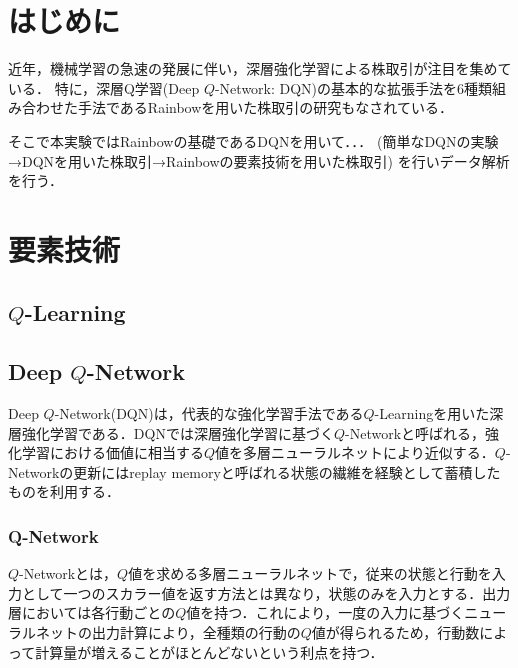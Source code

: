 \documentclass[twocolumn]{jarticle}
\begin{document}

\section{はじめに}
近年，機械学習の急速の発展に伴い，深層強化学習による株取引が注目を集めている．
特に，深層Q学習(Deep $Q$-Network: DQN)の基本的な拡張手法を6種類組み合わせた手法であるRainbowを用いた株取引の研究\cite{test}もなされている．

そこで本実験ではRainbowの基礎であるDQNを用いて．．．
(簡単なDQNの実験→DQNを用いた株取引→Rainbowの要素技術を用いた株取引)
を行いデータ解析を行う．

\section{要素技術}
    \subsection{$Q$-Learning}

    \subsection{Deep $Q$-Network}
    Deep $Q$-Network(DQN)は，代表的な強化学習手法である$Q$-Learningを用いた深層強化学習である．DQNでは深層強化学習に基づく$Q$-Networkと呼ばれる，強化学習における価値に相当する$Q$値を多層ニューラルネットにより近似する．$Q$-Networkの更新にはreplay memoryと呼ばれる状態の繊維を経験として蓄積したものを利用する．

        \subsubsection{Q-Network}
        $Q$-Networkとは，$Q$値を求める多層ニューラルネットで，従来の状態と行動を入力として一つのスカラー値を返す方法とは異なり，状態のみを入力とする．出力層においては各行動ごとの$Q$値を持つ．これにより，一度の入力に基づくニューラルネットの出力計算により，全種類の行動の$Q$値が得られるため，行動数によって計算量が増えることがほとんどないという利点を持つ．
\end{document}
